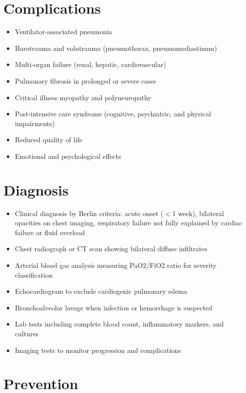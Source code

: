 \section{Complications}

\begin{itemize}[noitemsep]
  \item Ventilator-associated pneumonia
  \item Barotrauma and volutrauma (pneumothorax, pneumomediastinum)
  \item Multi-organ failure (renal, hepatic, cardiovascular)
  \item Pulmonary fibrosis in prolonged or severe cases
  \item Critical illness myopathy and polyneuropathy
  \item Post-intensive care syndrome (cognitive, psychiatric, and physical impairments)
  \item Reduced quality of life
  \item Emotional and psychological effects
\end{itemize}

\section{Diagnosis}

\begin{itemize}[noitemsep]
  \item Clinical diagnosis by Berlin criteria: acute onset ($<$1 week), bilateral opacities on chest imaging, respiratory failure not fully explained by cardiac failure or fluid overload
  \item Chest radiograph or CT scan showing bilateral diffuse infiltrates
  \item Arterial blood gas analysis measuring PaO2/FiO2 ratio for severity classification
  \item Echocardiogram to exclude cardiogenic pulmonary edema
  \item Bronchoalveolar lavage when infection or hemorrhage is suspected
  \item Lab tests including complete blood count, inflammatory markers, and cultures
  \item Imaging tests to monitor progression and complications
\end{itemize}

\section{Prevention}


